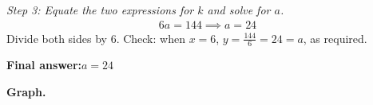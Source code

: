 \documentclass[11pt]{article}
\begin{document}
\textit{Step 3: Equate the two expressions for \( k \) and solve for \( a \).}
\[\begin{gathered}
6a = 144 \implies a = 24
\end{gathered}\]
Divide both sides by 6. Check: when \( x = 6 \), \( y = \frac{144}{6} = 24 = a \), as required.

\begin{answerbox}
\textbf{Final answer:}\quad \(\displaystyle  a = 24 \)
\end{answerbox}
\textbf{Graph.}

\begin{center}
\end{center}
\end{document}
